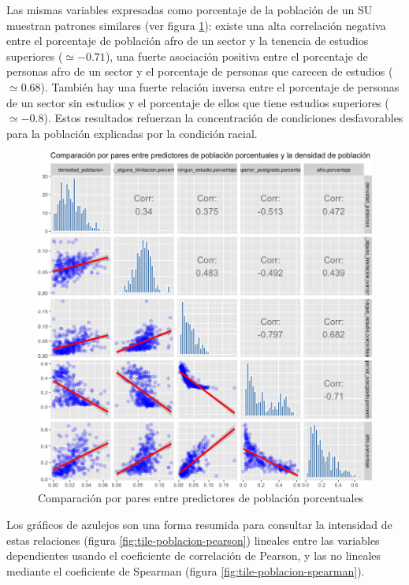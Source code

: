 \documentclass[12pt,a4paper,openany]{book}
\theoremstyle{definition}
\theoremstyle{definition}
\theoremstyle{definition}
\theoremstyle{remark}
\begin{document}
Las mismas variables expresadas como porcentaje de la población de un SU
muestran patrones similares (ver figura \ref{fig:bivar-poblacion-mod}):
existe una alta correlación negativa entre el porcentaje de población
afro de un sector y la tenencia de estudios superiores
(\(\simeq-0.71\)), una fuerte asociación positiva entre el porcentaje de
personas afro de un sector y el porcentaje de personas que carecen de
estudios (\(\simeq 0.68\)). También hay una fuerte relación inversa
entre el porcentaje de personas de un sector sin estudios y el
porcentaje de ellos que tiene estudios superiores (\(\simeq-0.8\)).
Estos resultados refuerzan la concentración de condiciones desfavorables
para la población explicadas por la condición racial.

\begin{figure}[H]

{\centering \includegraphics[width=1\linewidth]{tesis-unigis_files/figure-latex/bivar-poblacion-mod-1} 

}

\caption{Comparación por pares entre predictores de población porcentuales}\label{fig:bivar-poblacion-mod}
\end{figure}

Los gráficos de azulejos son una forma resumida para consultar la
intensidad de estas relaciones (figura \ref{fig:tile-poblacion-pearson})
lineales entre las variables dependientes usando el coeficiente de
correlación de Pearson, y las no lineales mediante el coeficiente de
Spearman (figura \ref{fig:tile-poblacion-spearman}).
\end{document}
